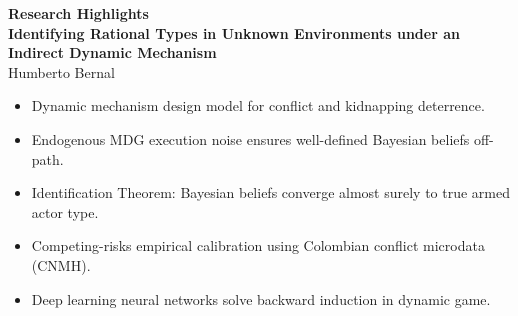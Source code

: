 \documentclass[12pt]{article}
\begin{document}
\doublespacing

\begin{center}
\textbf{Research Highlights} \\
\vspace{1em}
\textbf{Identifying Rational Types in Unknown Environments under an Indirect Dynamic Mechanism} \\
Humberto Bernal
\end{center}

\vspace{2em}

\begin{itemize}
    \item Dynamic mechanism design model for conflict and kidnapping deterrence.
    \item Endogenous MDG execution noise ensures well-defined Bayesian beliefs off-path.
    \item Identification Theorem: Bayesian beliefs converge almost surely to true armed actor type.
    \item Competing-risks empirical calibration using Colombian conflict microdata (CNMH).
    \item Deep learning neural networks solve backward induction in dynamic game.
\end{itemize}
\end{document}
